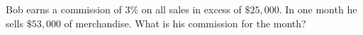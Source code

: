 Bob earns a commission of $3\%$ on all sales in excess of $\$25{,}000$. In one month he sells $\$53{,}000$ of merchandise. What is his commission for the month?
